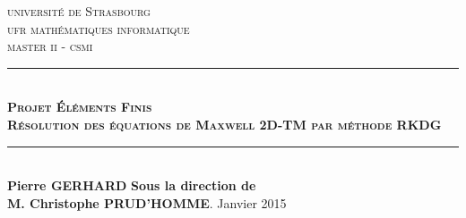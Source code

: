 
\begin{titlepage}
\newcommand{\HRule}{\rule{\linewidth}{0.5mm}}

\center
 
\textsc{\LARGE université de Strasbourg}\\[1.5cm]
\textsc{\Large ufr mathématiques informatique }\\[0.5cm]  
\textsc{\Large master ii - csmi}

\HRule \\

{ \textsc{\huge \bfseries Projet Éléments Finis\\
Résolution des équations de Maxwell 2D-TM par méthode RKDG}}
\HRule \\
\vfill
\textbf{Pierre \textsc{GERHARD}}
\vfill
\textbf{Sous la direction de}\\
\textbf{M. Christophe \textsc{PRUD'HOMME}}.
\vfill
{\large Janvier 2015}\\[0cm]

\end{titlepage}
